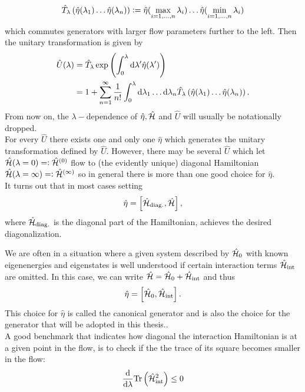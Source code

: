 \begin{equation}
\hat T_\lambda\left(\hat\eta(\lambda_1)\ldots\hat\eta(\lambda_n)\right)\vcentcolon=\hat\eta(\max\limits_{i=1,\ldots,n}\lambda_i)\ldots\hat\eta(\min\limits_{i=1,\ldots,n}\lambda_i)
\end{equation}
which commutes generators with larger flow parameters further to the left.
Then the unitary transformation is given by
\begin{align}
\hat U(\lambda)&=\hat T_\lambda\exp\left(\int_0^\lambda\mathrm d\lambda^\prime \hat\eta(\lambda^\prime)\right)\\
&=1+\sum\limits_{n=1}^\infty \frac1{n!}\int_0^\lambda\mathrm d\lambda_1\ldots\mathrm d\lambda_n\hat T_\lambda\left(\hat\eta(\lambda_1)\ldots\hat\eta(\lambda_n)\right).
\end{align}
From now on, the $\lambda-$dependence of $\hat\eta,\hat{\mathcal{H}}$ and $\hat U$ will usually be notationally dropped. \\
For every $\hat U$ there exists one and only one $\hat\eta$ which generates the unitary transformation defined by $\hat U$. However, there may be several $\hat U$ which let $\hat{\mathcal{H}}(\lambda = 0)=\vcentcolon \hat{\mathcal{H}}^{(0)}$ flow to (the evidently unique) diagonal Hamiltonian $\hat{\mathcal{H}}(\lambda=\infty)=\vcentcolon \hat{\mathcal{H}}^{(\infty)}$ so in general there is more than one good choice for $\hat\eta$. \\
It turns out that in most cases setting
\begin{equation}\label{FEQ_eta_def}
\hat\eta = \left[\hat{\mathcal{H}}_{\mathrm{diag.}},\hat{\mathcal{H}} \right],
\end{equation}
where $\hat{\mathcal{H}}_{\mathrm{diag.}}$ is the diagonal part of the Hamiltonian, achieves the desired diagonalization.  \par
We are often in a situation where a given system described by $\hat{\mathcal{H}}_0$ with known eigenenergies  and eigenstates is well understood if certain interaction terms $\hat{\mathcal{H}}_{\mathrm{int}}$ are omitted. In this case, we can write $\hat{\mathcal{H}} = \hat{\mathcal{H}}_0 + \hat{\mathcal{H}}_{\mathrm{int}}$ and thus
\begin{equation}\label{FEQ_can_eta_def}
\hat\eta = \left[\hat{\mathcal{H}}_0, \hat{\mathcal{H}}_{\mathrm{int}}\right].
\end{equation}
This choice for $\hat \eta$ is called the canonical generator and is also the choice for the generator that will be adopted in this thesis.. \\
A good benchmark that indicates how diagonal the interaction Hamiltonian is at a given point in the flow, is to check if the the trace of its square becomes smaller in the flow:
\begin{equation}\label{check_trace}
\frac{\mathrm d}{\mathrm d \lambda}\mathrm{Tr}\left(\hat{\mathcal{H}}^2_{\mathrm{int}}\right)\leq 0
\end{equation}
